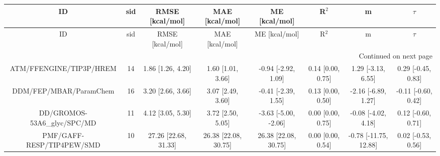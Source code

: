 \documentclass[8pt]{article}
\begin{document}
\begin{center}
\begin{footnotesize}
\begin{longtable}{|cccccccc|}
\toprule
                         ID & sid &      RMSE [kcal/mol] &       MAE [kcal/mol] &        ME [kcal/mol] &             R$^2$ &                     m &              $\tau$ \\
\midrule
\endfirsthead

\toprule
                         ID & sid &      RMSE [kcal/mol] &       MAE [kcal/mol] &        ME [kcal/mol] &             R$^2$ &                     m &              $\tau$ \\
\midrule
\endhead
\midrule
\multicolumn{8}{r}{{Continued on next page}} \\
\midrule
\endfoot

\bottomrule
\endlastfoot
    ATM/FFENGINE/TIP3P/HREM &  14 &    1.86 [1.26, 4.20] &    1.60 [1.01, 3.66] &  -0.94 [-2.92, 1.09] & 0.14 [0.00, 0.75] &    1.29 [-3.13, 6.55] &  0.29 [-0.45, 0.83] \\
     DDM/FEP/MBAR/ParamChem &  16 &    3.20 [2.66, 3.66] &    3.07 [2.49, 3.60] &  -0.41 [-2.39, 1.55] & 0.13 [0.00, 0.50] &   -2.16 [-6.89, 1.27] & -0.11 [-0.60, 0.42] \\
DD/GROMOS-53A6\_glyc/SPC/MD &  11 &    4.12 [3.05, 5.30] &    3.72 [2.50, 5.05] & -3.63 [-5.00, -2.06] & 0.00 [0.00, 0.75] &   -0.08 [-4.02, 4.18] &  0.12 [-0.60, 0.71] \\
  PMF/GAFF-RESP/TIP4PEW/SMD &  10 & 27.26 [22.68, 31.33] & 26.38 [22.08, 30.75] & 26.38 [22.08, 30.75] & 0.00 [0.00, 0.54] & -0.78 [-11.75, 12.88] &  0.02 [-0.53, 0.56] \\
\end{longtable}
\end{footnotesize}
\end{center}
\end{document}
